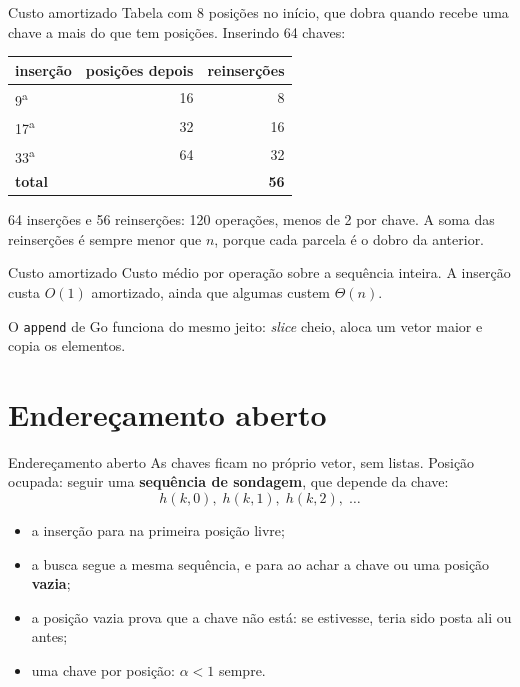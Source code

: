 \documentclass{beamer}
\begin{document}
\begin{frame}{Custo amortizado}
	Tabela com 8 posições no início, que dobra quando recebe uma chave a mais do
	que tem posições. Inserindo 64 chaves:

	\vspace{0.1cm}
	\begin{center}
		\small
		\begin{tabular}{lrr}
			\toprule
			\textbf{inserção} & \textbf{posições depois} & \textbf{reinserções} \\
			\midrule
			9\textsuperscript{a}                & 16                       & 8                    \\
			17\textsuperscript{a}               & 32                       & 16                   \\
			33\textsuperscript{a}               & 64                       & 32                   \\
			\midrule
			\textbf{total}    &                          & \textbf{56}          \\
			\bottomrule
		\end{tabular}
	\end{center}

	64 inserções e 56 reinserções: 120 operações, menos de 2 por chave. A soma das
	reinserções é sempre menor que $n$, porque cada parcela é o dobro da anterior.

	\begin{block}{Custo amortizado}
		Custo médio por operação sobre a sequência inteira. A inserção custa $O(1)$
		amortizado, ainda que algumas custem $\Theta(n)$.
	\end{block}

	\footnotesize O \texttt{append} de Go funciona do mesmo jeito: \emph{slice}
	cheio, aloca um vetor maior e copia os elementos.
\end{frame}

\section{Endereçamento aberto}

\begin{frame}{Endereçamento aberto}
	As chaves ficam no próprio vetor, sem listas. Posição ocupada: seguir uma
	\textbf{sequência de sondagem}, que depende da chave:
	\[
		h(k, 0),\; h(k, 1),\; h(k, 2),\; \ldots
	\]

	\vspace{0.2cm}
	\begin{itemize}
		\item a inserção para na primeira posição livre;
		\item a busca segue a mesma sequência, e para ao achar a chave ou uma
		      posição \textbf{vazia};
		\item a posição vazia prova que a chave não está: se estivesse, teria sido
		      posta ali ou antes;
		\item uma chave por posição: $\alpha < 1$ sempre.
	\end{itemize}
\end{frame}
\end{document}
